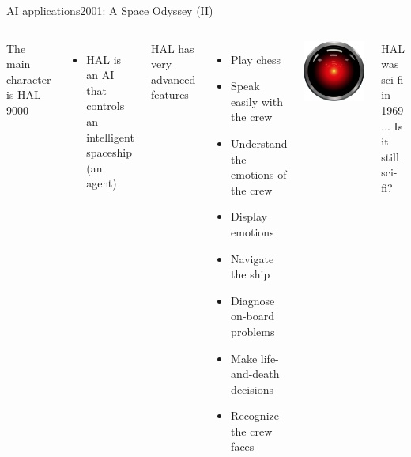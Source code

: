 \documentclass[10pt,compress]{beamer} %
\begin{document}
\begin{frame}{AI applications}{2001: A Space Odyssey (II)}
	\begin{columns}
			The main character is HAL 9000
			\begin{itemize}
			\item HAL is an AI that controls an intelligent spaceship (an agent)
			\end{itemize}
			HAL has very advanced features
			\begin{itemize}
			\item Play chess
			\item Speak easily with the crew
			\item Understand the emotions of the crew
			\item Display emotions
			\item Navigate the ship
			\item Diagnose on-board problems
			\item Make life-and-death decisions
			\item Recognize the crew faces
			\end{itemize}
	   	\begin{center}
		\includegraphics[width=0.8\linewidth]{figs/hal.png}
		\end{center}
		\begin{block}{}
			HAL was sci-fi in 1969 ... Is it still sci-fi?
		\end{block}
	\end{columns}
\end{frame}
\end{document}
